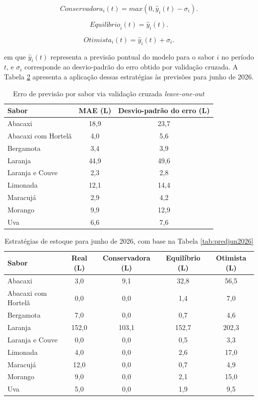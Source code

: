 \[\textit{Conservadora}_i(t) = max(0, \hat{y}_i(t)-\sigma_i).\]

\[\textit{Equilíbrio}_i(t) = \hat{y}_i(t).\]

\[\textit{Otimista}_i(t)=\hat{y}_i(t) + \sigma_i.\]

em que $\hat{y}_i(t)$ representa a previsão pontual do modelo para o sabor $i$ no período $t$, e $\sigma_i$ corresponde ao desvio-padrão do erro obtido por validação cruzada. A Tabela \ref{tab:estrategias} apresenta a aplicação dessas estratégias às previsões para junho de 2026.

\begin{table}[htpb]
\centering
\caption{Erro de previsão por sabor via validação cruzada \textit{leave-one-out}}
\label{tab:loocv}
\begin{tabular}{lcc}
\hline
\textbf{Sabor} & \textbf{MAE (L)} & \textbf{Desvio-padrão do erro (L)} \\
\hline
Abacaxi              & 18,9 & 23,7 \\
Abacaxi com Hortelã  & 4,0  & 5,6  \\
Bergamota             & 3,4  & 3,9  \\
Laranja               & 44,9 & 49,6 \\
Laranja e Couve       & 2,3  & 2,8  \\
Limonada              & 12,1 & 14,4 \\
Maracujá              & 2,9  & 4,2  \\
Morango               & 9,9  & 12,9 \\
Uva                   & 6,6  & 7,6  \\
\hline
\end{tabular}
\end{table}



\begin{table}[h]
\centering
\caption{Estratégias de estoque para junho de 2026, com base na Tabela \ref{tab:predjun2026}}
\label{tab:estrategias}
\begin{tabular}{p{3.56cm}cccc}
\hline
\textbf{Sabor} & \textbf{Real (L)} & \textbf{Conservadora (L)} & \textbf{Equilíbrio (L)} & \textbf{Otimista (L)} \\
\hline
Abacaxi           & 3,0   & 9,1   & 32,8  & 56,5  \\
Abacaxi com Hortelã  & 0,0   & 0,0   & 1,4   & 7,0   \\
Bergamota             & 7,0   & 0,0   & 0,7   & 4,6   \\
Laranja               & 152,0 & 103,1 & 152,7 & 202,3 \\
Laranja e Couve       & 0,0   & 0,0   & 0,5   & 3,3   \\
Limonada              & 4,0   & 0,0   & 2,6   & 17,0  \\
Maracujá              & 12,0  & 0,0   & 0,7   & 4,9   \\
Morango               & 9,0   & 0,0   & 2,1   & 15,0  \\
Uva                   & 5,0   & 0,0   & 1,9   & 9,5   \\
\hline
\end{tabular}
\end{table}

